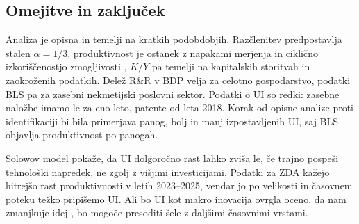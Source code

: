 \documentclass[12pt,a4paper]{article}
\begin{document}
\subsection{Omejitve in zaključek}
Analiza je opisna in temelji na kratkih podobdobjih. Razčlenitev predpostavlja stalen $\alpha=1/3$, produktivnost je ostanek z napakami merjenja in ciklično izkoriščenostjo zmogljivosti \parencite[str.~23--24]{polanec_rast}, $K/Y$ pa temelji na kapitalskih storitvah in zaokroženih podatkih. Delež R\&R v BDP velja za celotno gospodarstvo, podatki BLS pa za zasebni nekmetijski poslovni sektor. Podatki o UI so redki: zasebne naložbe imamo le za eno leto, patente od leta 2018. Korak od opisne analize proti identifikaciji bi bila primerjava panog, bolj in manj izpostavljenih UI, saj BLS objavlja produktivnost po panogah.

Solowov model pokaže, da UI dolgoročno rast lahko zviša le, če trajno pospeši tehnološki napredek, ne zgolj z višjimi investicijami. Podatki za ZDA kažejo hitrejšo rast produktivnosti v letih 2023--2025, vendar jo po velikosti in časovnem poteku težko pripišemo UI. Ali bo UI kot makro inovacija ovrgla oceno, da nam zmanjkuje idej \parencite[pros.~136--139]{grobovsek2026}, bo mogoče presoditi šele z daljšimi časovnimi vrstami.

\newpage
\printbibliography[title={Literatura in viri}, heading=bibintoc]
\end{document}
